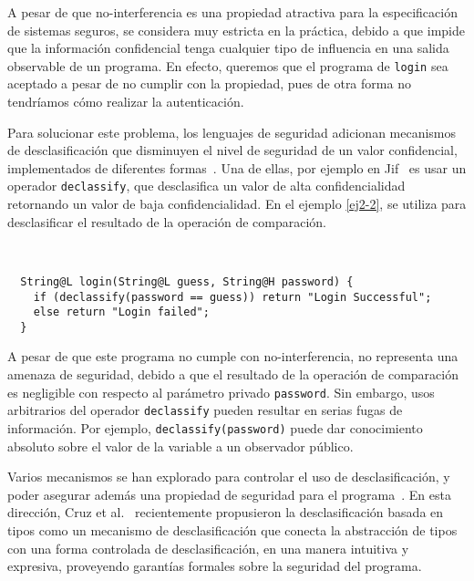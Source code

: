 A pesar de que no-interferencia es una propiedad atractiva para la especificación de sistemas seguros, se considera muy estricta en la práctica, debido a que impide que la información confidencial tenga cualquier tipo de influencia en una salida observable de un programa. En efecto, queremos que el programa de \texttt{login} sea aceptado a pesar de no cumplir con la propiedad, pues de otra forma no tendríamos cómo realizar la autenticación.

Para solucionar este problema, los lenguajes de seguridad adicionan mecanismos de desclasificación que disminuyen el nivel de seguridad de un valor confidencial, implementados de diferentes formas~\cite{sabelfeldSands:JCS09}. Una de ellas, por ejemplo en Jif~\cite{jif} es usar un operador \texttt{declassify}, que desclasifica un valor de alta confidencialidad retornando un valor de baja confidencialidad. En el ejemplo \ref{ej2-2}, se utiliza para desclasificar el resultado de la operación de comparación.
\clearpage
\begin{ej} \ \\
  \normalfont
  \label{ej2-2}
\begin{lstlisting}
  String@L login(String@L guess, String@H password) {
    if (declassify(password == guess)) return "Login Successful";
    else return "Login failed";
  }
\end{lstlisting}
\end{ej}


A pesar de que este programa no cumple con no-interferencia, no representa una amenaza de seguridad, debido a que el resultado de la operación de comparación es negligible con respecto al parámetro privado \texttt{password}. Sin embargo, usos arbitrarios del operador \texttt{declassify} pueden resultar en serias fugas de información. Por ejemplo, \texttt{declassify(password)} puede dar conocimiento absoluto sobre el valor de la variable a un observador público.

Varios mecanismos se han explorado para controlar el uso de desclasificación, y poder asegurar además una propiedad de seguridad para el programa~\cite{sabelfeldSands:JCS09}. En esta dirección, Cruz et al.~\cite{cruzAl:ecoop2017} recientemente propusieron la desclasificación basada en tipos como un mecanismo de desclasificación que conecta la abstracción de tipos con una forma controlada de desclasificación, en una manera intuitiva y expresiva, proveyendo garantías formales sobre la seguridad del programa.

